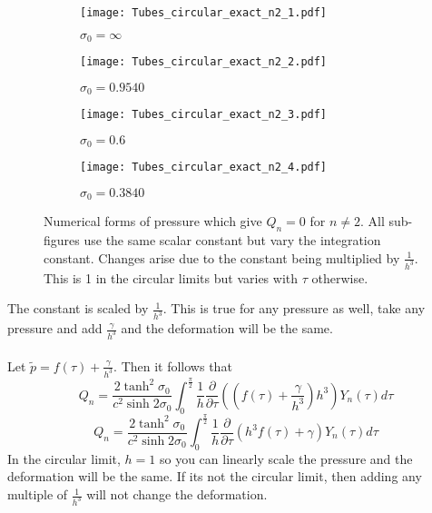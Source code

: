 \documentclass[12pt]{article}
\begin{document}
\begin{figure}[htbp]
  \centering
  \begin{subfigure}[b]{0.45\textwidth}
    \texttt{[image: Tubes\_circular\_exact\_n2\_1.pdf]}
    \caption*{$\sigma_0=\infty$}
  \end{subfigure}
  \begin{subfigure}[b]{0.45\textwidth}
    \texttt{[image: Tubes\_circular\_exact\_n2\_2.pdf]}
    \caption*{$\sigma_0=0.9540$}
  \end{subfigure}
  \begin{subfigure}[b]{0.45\textwidth}
    \texttt{[image: Tubes\_circular\_exact\_n2\_3.pdf]}
    \caption*{$\sigma_0=0.6$}
  \end{subfigure}
  \begin{subfigure}[b]{0.45\textwidth}
    \texttt{[image: Tubes\_circular\_exact\_n2\_4.pdf]}
    \caption*{$\sigma_0=0.3840$}
  \end{subfigure}
  \caption{Numerical forms of pressure which give $Q_n=0$ for $n \neq 2$. All sub-figures use the same scalar constant but vary the integration constant. Changes arise due to the constant being multiplied by $\frac{1}{h^3}$. This is 1 in the circular limits but varies with $\tau$ otherwise.}
  \label{fig:six-graphs2}
\end{figure} \vspace{1cm} The constant is scaled by $\frac{1}{h^3}$. This is true for any pressure as well, take any pressure and add $\frac{\gamma}{h^3}$ and the deformation will be the same.
\\
\\ Let $\tilde{p}=f(\tau)+\frac{\gamma}{h^3}$. Then it follows that $$Q_n=\frac{2\tanh^2\sigma_0}{c^2\sinh 2\sigma_0}\int_0^{\frac{\pi}{2}}\frac{1}{h}\frac{\partial}{\partial \tau}((f(\tau)+\frac{\gamma}{h^3})h^3)Y_n(\tau)d\tau$$
$$Q_n=\frac{2\tanh^2\sigma_0}{c^2\sinh 2\sigma_0}\int_0^{\frac{\pi}{2}}\frac{1}{h}\frac{\partial}{\partial \tau}(h^3f(\tau)+\gamma)Y_n(\tau)d\tau$$
In the circular limit, $h=1$ so you can linearly scale the pressure and the deformation will be the same. If its not the circular limit, then adding any multiple of $\frac{1}{h^3}$ will not change the deformation.
\end{document}
